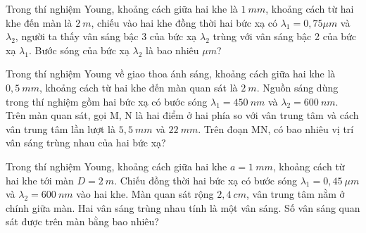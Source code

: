 \setcounter{ex}{0}
\PhanIII
\begin{ex}
Trong thí nghiệm Young, khoảng cách giữa hai khe là $1\ mm$, khoảng cách từ hai khe đến màn là $2\ m$, chiếu vào hai khe đồng thời hai bức xạ có $\lambda_{1} = 0,75 \mu m$ và $\lambda_{2}$, người ta thấy vân sáng bậc 3 của bức xạ $\lambda_{2}$ trùng với vân sáng bậc 2 của bức xạ $\lambda_{1}$. Bước sóng của bức xạ $\lambda_{2}$ là bao nhiêu $\mu m$?
\end{ex}
\begin{ex}
Trong thí nghiệm Young về giao thoa ánh sáng, khoảng cách giữa hai khe là $0,5\ mm$, khoảng cách từ hai khe đến màn quan sát là $2\ m$. Nguồn sáng dùng trong thí nghiệm gồm hai bức xạ có bước sóng $\lambda_1=450\ nm$ và $\lambda_2=600\ nm$. Trên màn quan sát, gọi M, N là hai điểm ở hai phía so với vân trung tâm và cách vân trung tâm lần lượt là $5,5\ mm$ và $22\ mm$. Trên đoạn MN, có bao nhiêu vị trí vân sáng trùng nhau của hai bức xạ?
\end{ex}
\begin{ex}
Trong thí nghiệm Young, khoảng cách giữa hai khe $a=1\ mm$, khoảng cách từ hai khe tới màn $D=2\ m$. Chiếu đồng thời hai bức xạ có bước sóng $\lambda_1=0,45\ \mu m$ và $\lambda_2=600\ nm$ vào hai khe. Màn quan sát rộng $2,4\ cm$, vân trung tâm nằm ở chính giữa màn. Hai vân sáng trùng nhau tính là một vân sáng. Số vân sáng quan sát được trên màn bằng bao nhiêu?
\end{ex}

